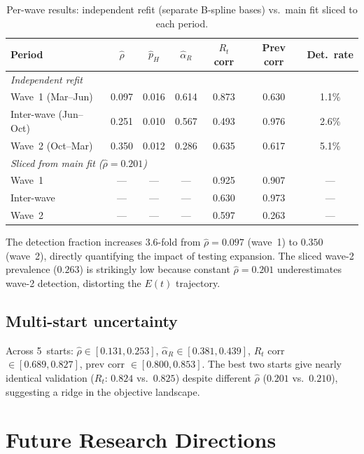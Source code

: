 \documentclass[11pt]{article}
\begin{document}
\begin{table}[ht]
\centering\small
\caption{Per-wave results: independent refit (separate B-spline bases) vs.\ main fit sliced to each period.}
\label{tab:wave-refit}
\begin{tabular}{lcccccc}
\toprule
Period & $\hat\rho$ & $\hat p_H$ & $\hat\alpha_R$ & $R_t$ corr & Prev corr & Det.\ rate \\
\midrule
\multicolumn{7}{l}{\emph{Independent refit}} \\
Wave~1 (Mar--Jun) & 0.097 & 0.016 & 0.614 & 0.873 & 0.630 & 1.1\% \\
Inter-wave (Jun--Oct) & 0.251 & 0.010 & 0.567 & 0.493 & 0.976 & 2.6\% \\
Wave~2 (Oct--Mar) & 0.350 & 0.012 & 0.286 & 0.635 & 0.617 & 5.1\% \\
\midrule
\multicolumn{7}{l}{\emph{Sliced from main fit ($\hat\rho=0.201$)}} \\
Wave~1 & --- & --- & --- & 0.925 & 0.907 & --- \\
Inter-wave & --- & --- & --- & 0.630 & 0.973 & --- \\
Wave~2 & --- & --- & --- & 0.597 & 0.263 & --- \\
\bottomrule
\end{tabular}
\end{table}

The detection fraction increases 3.6-fold from $\hat\rho=0.097$ (wave~1) to $0.350$ (wave~2), directly quantifying the impact of testing expansion. The sliced wave-2 prevalence ($0.263$) is strikingly low because constant $\hat\rho=0.201$ underestimates wave-2 detection, distorting the $E(t)$ trajectory.

\subsection{Multi-start uncertainty}\label{sec:results:multistart}

Across 5~starts: $\hat\rho\in[0.131,0.253]$, $\hat\alpha_R\in[0.381,0.439]$, $R_t$ corr $\in[0.689,0.827]$, prev corr $\in[0.800,0.853]$. The best two starts give nearly identical validation ($R_t$: $0.824$ vs.\ $0.825$) despite different $\hat\rho$ ($0.201$ vs.\ $0.210$), suggesting a ridge in the objective landscape.


\section{Future Research Directions}\label{sec:future}
\end{document}

